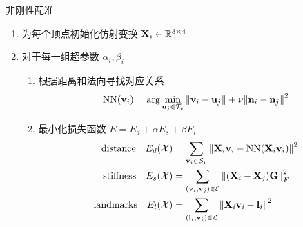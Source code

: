 \documentclass{beamer}
\begin{document}
\begin{frame}{非刚性配准}
  \begin{enumerate}
    \item 为每个顶点初始化仿射变换 $\vb{X}_i \in \mathbb{R}^{3 \times 4}$
    \item 对于每一组超参数 $\alpha_i, \beta_i$
          \begin{enumerate}
            \item 根据距离和法向寻找对应关系
                  \begin{equation*}
                    \mathrm{NN}(\vb{v}_i) = \arg\min_{\vb{u}_j \in \mathcal{T}_v} \norm{\vb{v}_i - \vb{u}_j} + \nu \norm{\vb{n}_i - \vb{n}_j}^2
                  \end{equation*}
            \item 最小化损失函数 $E = E_d + \alpha E_s + \beta E_l$
                  \begin{align*}
                    \text{distance} \quad E_d(\mathcal{X})  & = \sum_{\vb{v}_i \in \mathcal{S}_v} \norm{\vb{X}_i \vb{v}_i - \mathrm{NN}(\vb{X}_i \vb{v}_i)}^2 \\
                    \text{stiffness} \quad E_s(\mathcal{X}) & = \sum_{(\vb{v}_i, \vb{v}_j) \in \mathcal{E}} \norm{(\vb{X}_i - \vb{X}_j) \vb{G}}_F^2           \\
                    \text{landmarks} \quad E_l(\mathcal{X}) & = \sum_{(\vb{l}_i, \vb{v}_i) \in \mathcal{L}} \norm{\vb{X}_i \vb{v}_i - \vb{l}_i}^2
                  \end{align*}
          \end{enumerate}
  \end{enumerate}
\end{frame}
\end{document}
